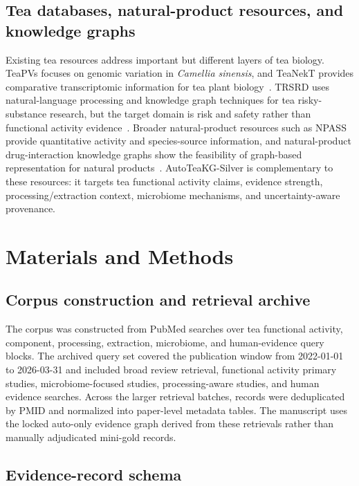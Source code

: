 \documentclass[11pt]{article}
\begin{document}
\subsection{Tea databases, natural-product resources, and knowledge graphs}

Existing tea resources address important but different layers of tea biology. TeaPVs focuses on genomic variation in \textit{Camellia sinensis}, and TeaNekT provides comparative transcriptomic information for tea plant biology~\cite{an2022teapvs,zheng2024teanekt}. TRSRD uses natural-language processing and knowledge graph techniques for tea risky-substance research, but the target domain is risk and safety rather than functional activity evidence~\cite{wang2023trsrd}. Broader natural-product resources such as NPASS provide quantitative activity and species-source information, and natural-product drug-interaction knowledge graphs show the feasibility of graph-based representation for natural products~\cite{zhao2023npass_update,taneja2023npdi_kg}. AutoTeaKG-Silver is complementary to these resources: it targets tea functional activity claims, evidence strength, processing/extraction context, microbiome mechanisms, and uncertainty-aware provenance.

\section{Materials and Methods}

\subsection{Corpus construction and retrieval archive}

The corpus was constructed from PubMed searches over tea functional activity, component, processing, extraction, microbiome, and human-evidence query blocks. The archived query set covered the publication window from 2022-01-01 to 2026-03-31 and included broad review retrieval, functional activity primary studies, microbiome-focused studies, processing-aware studies, and human evidence searches. Across the larger retrieval batches, records were deduplicated by PMID and normalized into paper-level metadata tables. The manuscript uses the locked auto-only evidence graph derived from these retrievals rather than manually adjudicated mini-gold records.

\subsection{Evidence-record schema}
\end{document}
